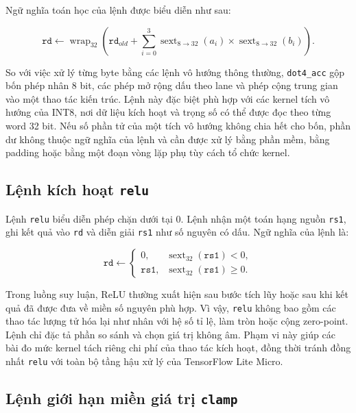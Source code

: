 \documentclass[../DoAn.tex]{subfiles}
\begin{document}
Ngữ nghĩa toán học của lệnh được biểu diễn như sau:

\begin{equation}
    \texttt{rd} \leftarrow \operatorname{wrap}_{32}
    \left(\texttt{rd}_{old} + \sum_{i=0}^{3}
    \operatorname{sext}_{8\rightarrow 32}(a_i) \times
    \operatorname{sext}_{8\rightarrow 32}(b_i)\right).
    \label{eq:dot4-acc-semantics}
\end{equation}

So với việc xử lý từng byte bằng các lệnh vô hướng thông thường, \texttt{dot4\_acc} gộp bốn phép nhân 8 bit, các phép mở rộng dấu theo lane và phép cộng trung gian vào một thao tác kiến trúc. Lệnh này đặc biệt phù hợp với các kernel tích vô hướng của INT8, nơi dữ liệu kích hoạt và trọng số có thể được đọc theo từng word 32 bit. Nếu số phần tử của một tích vô hướng không chia hết cho bốn, phần dư không thuộc ngữ nghĩa của lệnh và cần được xử lý bằng phần mềm, bằng padding hoặc bằng một đoạn vòng lặp phụ tùy cách tổ chức kernel.

\subsection{Lệnh kích hoạt \texttt{relu}}
\label{subsec:dac-ta-relu}

Lệnh \texttt{relu} biểu diễn phép chặn dưới tại 0. Lệnh nhận một toán hạng nguồn \texttt{rs1}, ghi kết quả vào \texttt{rd} và diễn giải \texttt{rs1} như số nguyên có dấu. Ngữ nghĩa của lệnh là:

\begin{equation}
    \texttt{rd} \leftarrow
    \begin{cases}
        0, & \operatorname{sext}_{32}(\texttt{rs1}) < 0, \\
        \texttt{rs1}, & \operatorname{sext}_{32}(\texttt{rs1}) \ge 0.
    \end{cases}
    \label{eq:relu-semantics}
\end{equation}

Trong luồng suy luận, ReLU thường xuất hiện sau bước tích lũy hoặc sau khi kết quả đã được đưa về miền số nguyên phù hợp. Vì vậy, \texttt{relu} không bao gồm các thao tác lượng tử hóa lại như nhân với hệ số tỉ lệ, làm tròn hoặc cộng zero-point. Lệnh chỉ đặc tả phần so sánh và chọn giá trị không âm. Phạm vi này giúp các bài đo mức kernel tách riêng chi phí của thao tác kích hoạt, đồng thời tránh đồng nhất \texttt{relu} với toàn bộ tầng hậu xử lý của TensorFlow Lite Micro.

\subsection{Lệnh giới hạn miền giá trị \texttt{clamp}}
\label{subsec:dac-ta-clamp}
\end{document}
